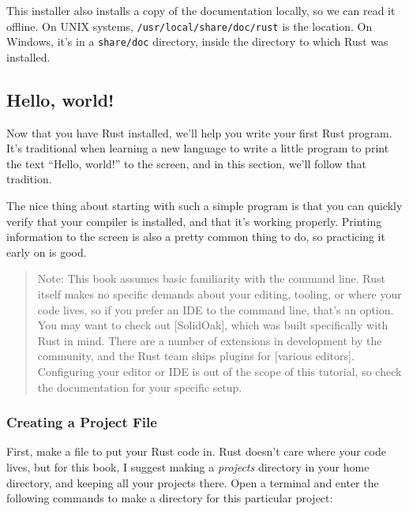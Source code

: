 \documentclass[a4paper,]{book}
\newenvironment{Shaded}{\begin{snugshade}}{\end{snugshade}}
\newcommand{\KeywordTok}[1]{\textcolor[rgb]{0.13,0.29,0.53}{\textbf{{#1}}}}
\newcommand{\NormalTok}[1]{{#1}}
\begin{document}
This installer also installs a copy of the documentation locally, so we
can read it offline. On UNIX systems, \texttt{/usr/local/share/doc/rust}
is the location. On Windows, it's in a \texttt{share/doc} directory,
inside the directory to which Rust was installed.

\subsection{Hello, world!}\label{hello-world}

Now that you have Rust installed, we'll help you write your first Rust
program. It's traditional when learning a new language to write a little
program to print the text ``Hello, world!'' to the screen, and in this
section, we'll follow that tradition.

The nice thing about starting with such a simple program is that you can
quickly verify that your compiler is installed, and that it's working
properly. Printing information to the screen is also a pretty common
thing to do, so practicing it early on is good.

\begin{quote}
Note: This book assumes basic familiarity with the command line. Rust
itself makes no specific demands about your editing, tooling, or where
your code lives, so if you prefer an IDE to the command line, that's an
option. You may want to check out {[}SolidOak{]}, which was built
specifically with Rust in mind. There are a number of extensions in
development by the community, and the Rust team ships plugins for
{[}various editors{]}. Configuring your editor or IDE is out of the
scope of this tutorial, so check the documentation for your specific
setup.
\end{quote}

\subsubsection{Creating a Project File}\label{creating-a-project-file}

First, make a file to put your Rust code in. Rust doesn't care where
your code lives, but for this book, I suggest making a \emph{projects}
directory in your home directory, and keeping all your projects there.
Open a terminal and enter the following commands to make a directory for
this particular project:

\begin{Shaded}
\end{Shaded}
\end{document}
